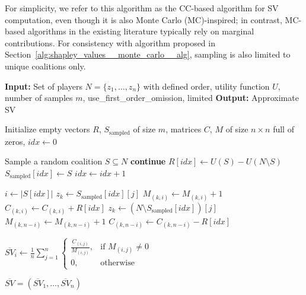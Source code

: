 For simplicity, we refer to this algorithm as the CC-based algorithm for SV computation, even though it is also Monte Carlo (MC)-inspired; in contrast, MC-based algorithms in the existing literature typically rely on marginal contributions. For consistency with algorithm proposed in Section~\ref{alg:shapley_values__monte_carlo__alg}, sampling is also limited to unique coalitions only.

\begin{algorithm}[b!]
\caption{Complementary Contributions (CC)-based algorithm for approximation of Shapley values (SV).}
\label{alg:shapley_values__complementary__alg}
\begin{algorithmic}[1]

\State \textbf{Input:} Set of players $N = \{z_1, \dots, z_n\}$ with defined order, utility function $U$, number of samples $m$,
use\_first\_order\_omission, limited
\State \textbf{Output:} Approximate SV

\State Initialize empty vectors $R$, $S_{\text{sampled}}$ of size $m$, matrices $C$, $M$ of size $n \times n$ full of zeros, $idx \gets 0$

    \State Sample a random coalition $S \subseteq N$
        \State \textbf{continue} 
    \EndIf
    \State $R[idx] \gets U(S) - U(N \setminus S)$
    \State $S_{\text{sampled}}[idx] \gets S$
    \State $idx \gets idx + 1$
\EndWhile

 
    \State $i \gets |S[idx]|$ 
        \State $z_k \gets S_{\text{sampled}}[idx][j]$ 
        \State $M_{(k, i)} \gets M_{(k, i)} + 1$
        \State $C_{(k, i)} \gets C_{(k, i)} + R[idx]$
    \EndFor
        \State $z_k \gets (N \setminus S_{\text{sampled}}[idx])[j]$
        \State $M_{(k, n - i)} \gets M_{(k, n - i)} + 1$
        \State $C_{(k, n - i)} \gets C_{(k, n - i)} - R[idx]$
    \EndFor
\EndFor

 
    \State $\overline{SV}_i \gets \frac{1}{n} \sum_{j = 1}^{n}
        \begin{cases}
            \frac{C_{(i, j)}}{M_{(i, j)}}, & \text{if } M_{(i, j)} \neq 0 \\
            0, & \text{otherwise}
        \end{cases}$
\EndFor

\State \Return $\overline{SV} = (\overline{SV}_1, \dots, \overline{SV}_n)$

\end{algorithmic}
\end{algorithm}


